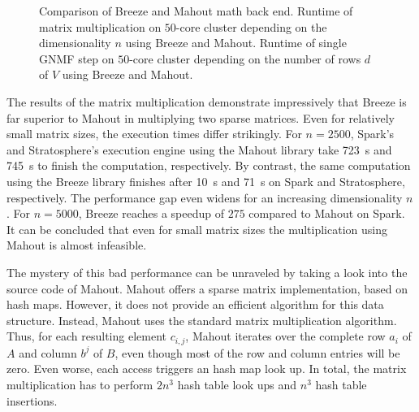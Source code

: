 \begin{figure}
\begin{subfigure}{\dualpgfwidth}
		\caption{}
		\label{subfig:nmfMathBackend}
	\end{subfigure}
	\caption{Comparison of Breeze and Mahout math back end.  Runtime of matrix multiplication on $50$-core cluster depending on the dimensionality $n$ using Breeze and Mahout.  Runtime of single GNMF step on $50$-core cluster depending on the number of rows $d$ of $V$ using Breeze and Mahout.}
	\label{fig:nnmfLoadMathBackend}
\end{figure}

The results of the matrix multiplication demonstrate impressively that Breeze is far superior to Mahout in multiplying two sparse matrices.
Even for relatively small matrix sizes, the execution times differ strikingly.
For $n=2500$, Spark's and Stratosphere's execution engine using the Mahout library take \SI{723}{\second} and \SI{745}{\second} to finish the computation, respectively.
By contrast, the same computation using the Breeze library finishes after \SI{10}{\second} and \SI{71}{\second} on Spark and Stratosphere, respectively.
The performance gap even widens for an increasing dimensionality $n$.
For $n=5000$, Breeze reaches a speedup of $275$ compared to Mahout on Spark.
It can be concluded that even for small matrix sizes the multiplication using Mahout is almost infeasible.

The mystery of this bad performance can be unraveled by taking a look into the source code of Mahout.
Mahout offers a sparse matrix implementation, based on hash maps.
However, it does not provide an efficient algorithm for this data structure.
Instead, Mahout uses the standard matrix multiplication algorithm.
Thus, for each resulting element $c_{i,j}$, Mahout iterates over the complete row $a_i$ of $A$ and column $b^{j}$ of $B$, even though most of the row and column entries will be zero.
Even worse, each access triggers an hash map look up.
In total, the matrix multiplication has to perform $2n^3$ hash table look ups and $n^3$ hash table insertions.

